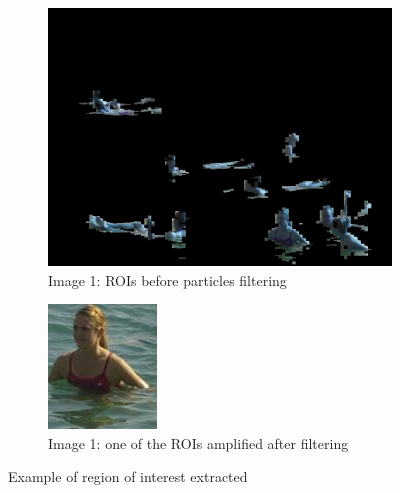 \begin{figure}[h]
        \centering
        \begin{subfigure}[h]{0.3\textwidth}
                \includegraphics[width=\textwidth]{Images/proc}
                \caption{Image 1: ROIs before particles filtering}
        \end{subfigure}%
        \quad
        \begin{subfigure}[h]{0.3\textwidth}
                \includegraphics[width=\textwidth]{Images/ROI}
                \caption{Image 1: one of the ROIs amplified after filtering}
        \end{subfigure}
        \caption{Example of region of interest extracted}
         \label{fig:ROIs}
\end{figure}


